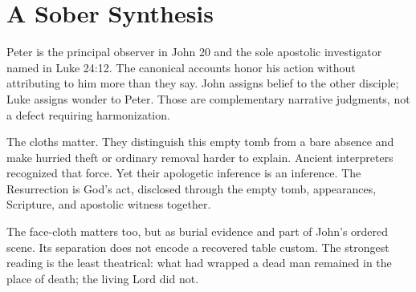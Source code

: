 \section{A Sober Synthesis}

Peter is the principal observer in John 20 and the sole apostolic investigator
named in Luke 24:12. The canonical accounts honor his action without attributing
to him more than they say. John assigns belief to the other disciple; Luke
assigns wonder to Peter. Those are complementary narrative judgments, not a
defect requiring harmonization.

The cloths matter. They distinguish this empty tomb from a bare absence and
make hurried theft or ordinary removal harder to explain. Ancient interpreters
recognized that force. Yet their apologetic inference is an inference. The
Resurrection is God's act, disclosed through the empty tomb, appearances,
Scripture, and apostolic witness together.

The face-cloth matters too, but as burial evidence and part of John's ordered
scene. Its separation does not encode a recovered table custom. The strongest
reading is the least theatrical: what had wrapped a dead man remained in the
place of death; the living Lord did not.

